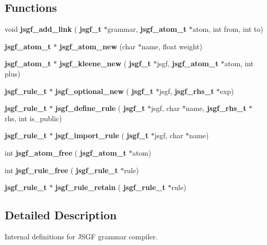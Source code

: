 \subsection*{Functions}
\begin{DoxyCompactItemize}
\item 
\mbox{\label{jsgf__internal_8h_acb5af4a04abc56a8584eba9b937f8154}} 
void {\bfseries jsgf\+\_\+add\+\_\+link} (\textbf{ jsgf\+\_\+t} $\ast$grammar, \textbf{ jsgf\+\_\+atom\+\_\+t} $\ast$atom, int from, int to)
\item 
\mbox{\label{jsgf__internal_8h_a0e59b63784fa8761358bb2bdf568bec1}} 
\textbf{ jsgf\+\_\+atom\+\_\+t} $\ast$ {\bfseries jsgf\+\_\+atom\+\_\+new} (char $\ast$name, float weight)
\item 
\mbox{\label{jsgf__internal_8h_ab9dc2ab39224cda76c43822150cf7e67}} 
\textbf{ jsgf\+\_\+atom\+\_\+t} $\ast$ {\bfseries jsgf\+\_\+kleene\+\_\+new} (\textbf{ jsgf\+\_\+t} $\ast$jsgf, \textbf{ jsgf\+\_\+atom\+\_\+t} $\ast$atom, int plus)
\item 
\mbox{\label{jsgf__internal_8h_a4a07cb0721add8783f0ea24dfacd6c0f}} 
\textbf{ jsgf\+\_\+rule\+\_\+t} $\ast$ {\bfseries jsgf\+\_\+optional\+\_\+new} (\textbf{ jsgf\+\_\+t} $\ast$jsgf, \textbf{ jsgf\+\_\+rhs\+\_\+t} $\ast$exp)
\item 
\mbox{\label{jsgf__internal_8h_ae7e6644fc37252110c3c0ea0edd229f7}} 
\textbf{ jsgf\+\_\+rule\+\_\+t} $\ast$ {\bfseries jsgf\+\_\+define\+\_\+rule} (\textbf{ jsgf\+\_\+t} $\ast$jsgf, char $\ast$name, \textbf{ jsgf\+\_\+rhs\+\_\+t} $\ast$rhs, int is\+\_\+public)
\item 
\mbox{\label{jsgf__internal_8h_afe1e47584e4dd80929552ffed77373f2}} 
\textbf{ jsgf\+\_\+rule\+\_\+t} $\ast$ {\bfseries jsgf\+\_\+import\+\_\+rule} (\textbf{ jsgf\+\_\+t} $\ast$jsgf, char $\ast$name)
\item 
\mbox{\label{jsgf__internal_8h_a289d683bf62d1a5aaac6917fa64f54f2}} 
int {\bfseries jsgf\+\_\+atom\+\_\+free} (\textbf{ jsgf\+\_\+atom\+\_\+t} $\ast$atom)
\item 
\mbox{\label{jsgf__internal_8h_af2faf6fb74ad1e4d43cf990c1bcec672}} 
int {\bfseries jsgf\+\_\+rule\+\_\+free} (\textbf{ jsgf\+\_\+rule\+\_\+t} $\ast$rule)
\item 
\mbox{\label{jsgf__internal_8h_ad152a23eb0f0d9af8417919fc93074fd}} 
\textbf{ jsgf\+\_\+rule\+\_\+t} $\ast$ {\bfseries jsgf\+\_\+rule\+\_\+retain} (\textbf{ jsgf\+\_\+rule\+\_\+t} $\ast$rule)
\end{DoxyCompactItemize}


\subsection{Detailed Description}
Internal definitions for J\+S\+GF grammar compiler. 

